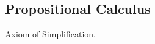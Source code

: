 \newbox\mlinebox
\newbox\mtrialbox
\newbox\startprefix  %
\newbox\contprefix  %
\def\startm{  %
  \setbox\mlinebox=\hbox{\unhcopy\startprefix}
}
\def\m#1{  %
  \setbox\mtrialbox=\hbox{\unhcopy\mlinebox $\,#1$}
  \ifdim\wd\mtrialbox>\hsize
    \box\mlinebox
    \setbox\mlinebox=\hbox{\unhcopy\contprefix $\,#1$}
  \else
    \setbox\mlinebox=\hbox{\unhbox\mtrialbox}
  \fi
}
\def\endm{  %
  \box\mlinebox
}

\newcommand\SLASH{\char`\\~}
\newcommand\TOR{\char`\\/~}
\newcommand\TAND{/\char`\\~}
%
\newlength\mystoreparindent
\newlength\mystorehangindent
\newenvironment{mmraw}{%
\setlength{\mystoreparindent}{\the\parindent}
\setlength{\mystorehangindent}{\the\hangindent}
\setlength{\parindent}{0pt} %
\setlength{\hangindent}{\wd\the\contprefix}
\begin{flushleft}
\begin{frenchspacing}
\begin{tt}
{\unhcopy\startprefix}%
}{%
\end{tt}
\end{frenchspacing}
\end{flushleft}
\setlength{\parindent}{\mystoreparindent}
\setlength{\hangindent}{\mystorehangindent}
\vskip 1ex
}

\subsection{Propositional Calculus}\label{propcalc}

Axiom of Simplification.\label{ax1}

